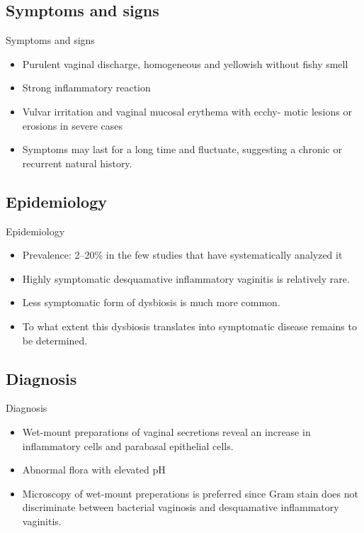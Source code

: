 \documentclass{beamer}
\begin{document}
\subsection{Symptoms and signs}
\begin{frame}{Symptoms and signs}
    \begin{itemize}
        \item Purulent vaginal discharge, homogeneous and yellowish without fishy smell
        \item Strong inflammatory reaction
        \item Vulvar irritation and vaginal mucosal erythema with ecchy- motic
              lesions or erosions in severe cases
        \item Symptoms may last for a long time and fluctuate, suggesting a
              chronic or recurrent natural history.
    \end{itemize}
\end{frame}


\subsection{Epidemiology}
\begin{frame}{Epidemiology}
    \begin{itemize}
        \item Prevalence: 2--20\% in the few studies that have systematically analyzed it
        \item Highly symptomatic desquamative inflammatory vaginitis is relatively rare.
        \item Less symptomatic form of dysbiosis is much more common.
        \item To what extent this dysbiosis translates into symptomatic disease remains to be determined.
    \end{itemize}
\end{frame}

\subsection{Diagnosis}
\begin{frame}{Diagnosis}
    \begin{itemize}
        \item Wet-mount preparations of vaginal secretions reveal an increase
              in inflammatory cells and parabasal epithelial cells.
        \item Abnormal flora with elevated pH
        \item Microscopy of wet-mount preperations is preferred since Gram
              stain does not discriminate between bacterial vaginosis and
              desquamative inflammatory vaginitis.
    \end{itemize}
\end{frame}
\end{document}
